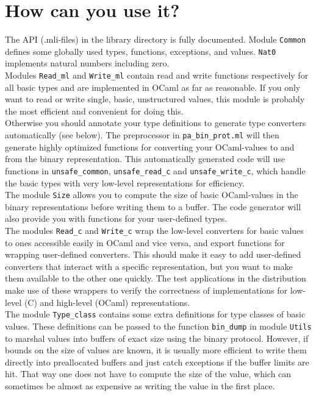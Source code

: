 \documentclass[12pt]{article}
\begin{document}
\section{How can you use it?}

The API (.mli-files) in the library directory is fully documented.
Module \verb=Common= defines some globally used types, functions, exceptions,
and values.  \verb=Nat0= implements natural numbers including zero.\\

Modules \verb=Read_ml= and \verb=Write_ml= contain read and write functions
respectively for all basic types and are implemented in OCaml as
far as reasonable.  If you only want to read or write single, basic,
unstructured values, this module is probably the most efficient and
convenient for doing this.\\

Otherwise you should annotate your type definitions to generate
type converters automatically (see below).  The preprocessor in
\verb=pa_bin_prot.ml= will then generate highly optimized functions for
converting your OCaml-values to and from the binary representation.  This
automatically generated code will use functions in \verb=unsafe_common=,
\verb=unsafe_read_c= and \verb=unsafe_write_c=, which handle the basic
types with very low-level representations for efficiency.\\

The module \verb=Size= allows you to compute the size of basic
OCaml-values in the binary representations before writing them to
a buffer.  The code generator will also provide you with functions for
your user-defined types.\\

The modules \verb=Read_c= and \verb=Write_c= wrap the low-level converters
for basic values to ones accessible easily in OCaml and vice versa, and
export functions for wrapping user-defined converters.  This should make
it easy to add user-defined converters that interact with a specific
representation, but you want to make them available to the other one
quickly.  The test applications in the distribution make use of these
wrappers to verify the correctness of implementations for low-level (C)
and high-level (OCaml) representations.\\

The module \verb=Type_class= contains some extra definitions for type
classes of basic values.  These definitions can be passed to the function
\verb=bin_dump= in module \verb=Utils= to marshal values into buffers
of exact size using the binary protocol.  However, if bounds on the size
of values are known, it is usually more efficient to write them directly
into preallocated buffers and just catch exceptions if the buffer limits
are hit.  That way one does not have to compute the size of the value,
which can sometimes be almost as expensive as writing the value in the
first place.\\
\end{document}
